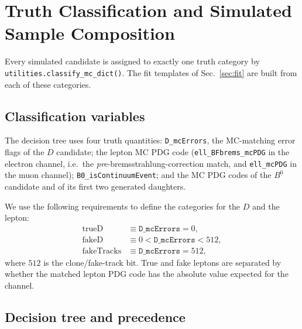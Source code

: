 \section{Truth Classification and Simulated Sample Composition}
\label{sec:truth}

Every simulated candidate is assigned to exactly one truth category by
\texttt{utilities.classify\_mc\_dict()}.
The fit templates of
Sec.~\ref{sec:fit} are built
from each of these categories.

\subsection{Classification variables}
\label{sec:truth:vars}

The decision tree uses four truth quantities:
\texttt{D\_mcErrors}, the MC-matching error flags of the $D$ candidate;
the lepton MC PDG code (\texttt{ell\_BFbrems\_mcPDG} in the electron channel,
i.e.\ the \emph{pre}-bremsstrahlung-correction match, and
\texttt{ell\_mcPDG} in the muon channel);
\texttt{B0\_isContinuumEvent}; and the MC PDG codes of the $B^{0}$ candidate
and of its first two generated daughters.

We use the following requirements to define the categories for the $D$ and the lepton:
\begin{align}
  \mathrm{trueD} &\equiv \texttt{D\_mcErrors} = 0, \\
  \mathrm{fakeD} &\equiv 0 < \texttt{D\_mcErrors} < 512, \\
  \mathrm{fakeTracks} &\equiv \texttt{D\_mcErrors} = 512 ,
\end{align}
where $512$ is the clone/fake-track bit.
True and fake leptons are separated by whether the matched lepton PDG code
has the absolute value expected for the channel.

\subsection{Decision tree and precedence}
\label{sec:truth:tree}

